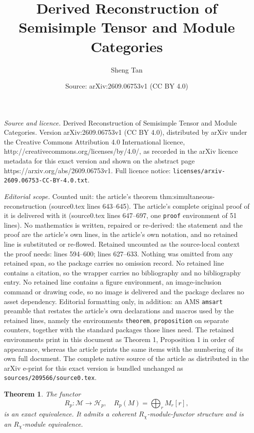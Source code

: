 \documentclass[10pt,a4paper]{amsart}
\title{Derived Reconstruction of Semisimple Tensor and Module Categories}
\author{Sheng Tan}
\date{Source: arXiv:2609.06753v1 (CC BY 4.0)}
\newtheorem{theorem}{Theorem}
\newcommand{\Hh}{\mathcal H}
\newcommand{\M}{\mathcal M}
\begin{document}
\maketitle

\noindent\emph{Source and licence.} Derived Reconstruction of Semisimple Tensor and Module Categories. Version arXiv:2609.06753v1 (CC BY 4.0), distributed by arXiv under the Creative Commons Attribution 4.0 International licence, http://creativecommons.org/licenses/by/4.0/, as recorded in the arXiv licence metadata for this exact version and shown on the abstract page https://arxiv.org/abs/2609.06753v1. Full licence notice: \texttt{licenses/arxiv-2609.06753-CC-BY-4.0.txt}.\par\smallskip

\noindent\textit{Editorial scope.} Counted unit: the article's theorem thm:simultaneous-reconstruction (source0.tex lines 643--645). The article's complete original proof of it is delivered with it (source0.tex lines 647--697, one \texttt{proof} environment of 51 lines). No mathematics is written, repaired or re-derived: the statement and the proof are the article's own lines, in the article's own notation, and no retained line is substituted or re-flowed.  Retained uncounted as the source-local context the proof needs: lines 594--600; lines 627--633.  Nothing was omitted from any retained span, so the package carries no omission record.  No retained line contains a citation, so the wrapper carries no bibliography and no bibliography entry.  No retained line contains a figure environment, an image-inclusion command or drawing code, so no image is delivered and the package declares no asset dependency.  Editorial formatting only, in addition: an AMS \texttt{amsart} preamble that restates the article's own declarations and macros used by the retained lines, namely the environments \texttt{theorem}, \texttt{proposition} on separate counters, together with the standard packages those lines need.  The retained environments print in this document as Theorem 1, Proposition 1 in order of appearance, whereas the article prints the same items with the numbering of its own full document.  The complete native source of the article as distributed in the arXiv e-print for this exact version is bundled unchanged as \texttt{sources/209566/source0.tex}.
\begin{theorem}\label{thm:module-regrading}
The functor
\[
R_p:\M\rightarrow\Hh_p,\quad R_p(M)=\bigoplus_r M_r[r],
\]
is an exact equivalence. It admits a coherent $R_\chi$-module-functor structure and is an $R_\chi$-module equivalence.
\end{theorem}
\end{document}
